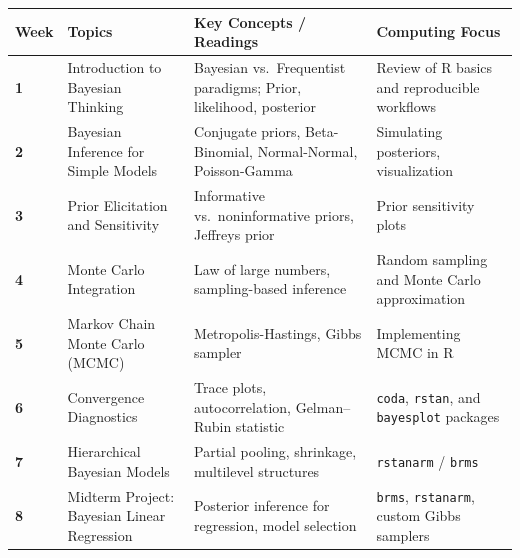 \documentclass[
  letterpaper,
  DIV=11,
  numbers=noendperiod]{scrreprt}
\begin{document}
\begin{longtable}[]{@{}
  >{\centering\arraybackslash}p{}
  >{\raggedright\arraybackslash}p{}
  >{\raggedright\arraybackslash}p{}
  >{\raggedright\arraybackslash}p{}@{}}
\toprule\noalign{}
\begin{minipage}[b]{\linewidth}\centering
\textbf{Week}
\end{minipage} & \begin{minipage}[b]{\linewidth}\raggedright
\textbf{Topics}
\end{minipage} & \begin{minipage}[b]{\linewidth}\raggedright
\textbf{Key Concepts / Readings}
\end{minipage} & \begin{minipage}[b]{\linewidth}\raggedright
\textbf{Computing Focus}
\end{minipage} \\
\midrule\noalign{}
\endhead
\bottomrule\noalign{}
\endlastfoot
\textbf{1} & Introduction to Bayesian Thinking & Bayesian
vs.~Frequentist paradigms; Prior, likelihood, posterior & Review of R
basics and reproducible workflows \\
\textbf{2} & Bayesian Inference for Simple Models & Conjugate priors,
Beta-Binomial, Normal-Normal, Poisson-Gamma & Simulating posteriors,
visualization \\
\textbf{3} & Prior Elicitation and Sensitivity & Informative
vs.~noninformative priors, Jeffreys prior & Prior sensitivity plots \\
\textbf{4} & Monte Carlo Integration & Law of large numbers,
sampling-based inference & Random sampling and Monte Carlo
approximation \\
\textbf{5} & Markov Chain Monte Carlo (MCMC) & Metropolis-Hastings,
Gibbs sampler & Implementing MCMC in R \\
\textbf{6} & Convergence Diagnostics & Trace plots, autocorrelation,
Gelman--Rubin statistic & \texttt{coda}, \texttt{rstan}, and
\texttt{bayesplot} packages \\
\textbf{7} & Hierarchical Bayesian Models & Partial pooling, shrinkage,
multilevel structures & \texttt{rstanarm} / \texttt{brms} \\
\textbf{8} & Midterm Project: Bayesian Linear Regression & Posterior
inference for regression, model selection & \texttt{brms},
\texttt{rstanarm}, custom Gibbs samplers \\

\end{longtable}
\end{document}
